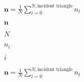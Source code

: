 \documentclass{article}
\begin{document}
$ \mathbf{n} = \frac{1}{N} \sum_{i=0}^{N, \textrm{incident triangle}} n_t$
\pagebreak

$\mathbf{n}$
\pagebreak

$N$
\pagebreak

$n_i$
\pagebreak

$i$
\pagebreak

$\mathbf{n} = \frac{1}{N} \sum_{i=0}^{N, \textrm{incident triangle}}n_t$
\pagebreak
\end{document}
